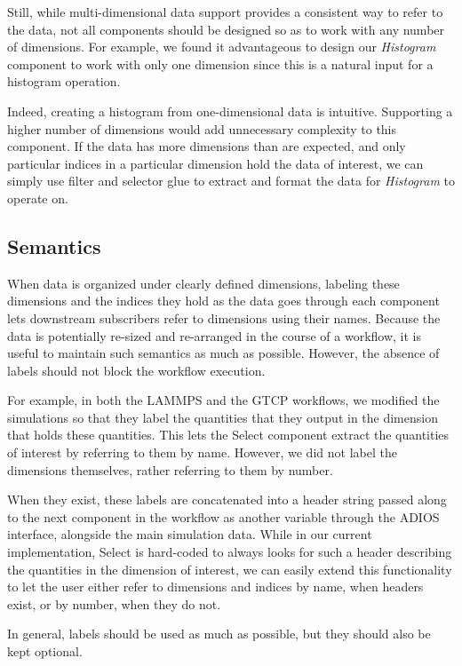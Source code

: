 Still, while multi-dimensional data support
provides a consistent way to refer
to the data, not all components should be
designed so as to work with
any number of dimensions.
For example, we found it advantageous to
design our {\em Histogram} component to work with
only one dimension since this is
a natural input for a histogram operation.

Indeed, creating a histogram from one-dimensional data is intuitive.
Supporting a higher number of dimensions
would add unnecessary complexity
to this component. If the data has more
dimensions than are expected,
and only particular indices in a particular
dimension hold the data of interest,
we can simply use filter and selector
glue to extract and format the data for
{\em Histogram} to operate on.
\fi

\subsection{Semantics}

When data is organized under clearly defined
dimensions, labeling these
dimensions and the indices they hold
as the data goes through each component
lets downstream subscribers
refer to dimensions using their names.
Because the data is potentially re-sized
and re-arranged in the course of a workflow,
it is useful to maintain such
semantics as much as possible. However,
the absence of labels should not block
the workflow execution.

For example, in both the LAMMPS and the GTCP workflows, we modified
the simulations so that they label the
quantities that they output in the
dimension that holds
these quantities. This lets the Select component
extract the quantities of interest by referring
to them by name. However, we did not label the dimensions
themselves, rather referring to them by number. 

When they exist, these labels are concatenated
into a header string passed along to the
next component in the workflow as another variable
through the ADIOS interface, alongside the main
simulation data.
While in our current implementation, Select is hard-coded to
always looks for such a header describing the quantities
in the dimension of interest, 
we can easily extend this functionality to let the user either refer
to dimensions and indices by name, when headers exist, or by number,
when they do not.

In general, labels should be used as much as possible, but they
should also be kept optional.

